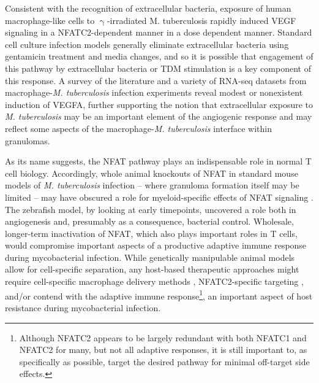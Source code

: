 Consistent with the recognition of extracellular bacteria, exposure of human macrophage-like cells to $\upgamma$-irradiated M. tuberculosis rapidly induced VEGF signaling in a NFATC2-dependent manner in a dose dependent manner. Standard cell culture infection models generally eliminate extracellular bacteria using gentamicin treatment and media changes, and so it is possible that engagement of this pathway by extracellular bacteria or TDM stimulation is a key component of this response. A survey of the literature and a variety \citep{Lee2019, Pisu2020, Hall2021, Looney2021, Pu2021} of RNA-seq datasets from macrophage-\textit{M. tuberculosis} infection experiments reveal modest or nonexistent induction of VEGFA, further supporting the notion that extracellular exposure to \textit{M. tuberculosis} may be an important element of the angiogenic response and may reflect some aspects of the macrophage-\textit{M. tuberculosis} interface within granulomas.

As its name suggests, the NFAT pathway plays an indispensable role in normal T cell biology. Accordingly, whole animal knockouts of NFAT in standard mouse models of \textit{M. tuberculosis} infection -- where granuloma formation itself may be limited -- may have obscured a role for myeloid-specific effects of NFAT signaling \citep{Via2012}. The zebrafish model, by looking at early timepoints, uncovered a role both in angiogenesis and, presumably as a consequence, bacterial control. Wholesale, longer-term inactivation of NFAT, which also plays important roles in T cells, would compromise important aspects of a productive adaptive immune response during mycobacterial infection. While genetically manipulable animal models allow for cell-specific separation, any host-based therapeutic approaches might require cell-specific macrophage delivery methods \citep{Hu2019, Mukhtar2020, Colombo2022}, NFATC2-specific targeting \citep{Kitamura2021}, and/or contend with the adaptive immune response\footnote{Although NFATC2 appears to be largely redundant with both NFATC1 and NFATC2 for many, but not all adaptive responses, it is still important to, as specifically as possible, target the desired pathway for minimal off-target side effects.}, an important aspect of host resistance during mycobacterial infection.

